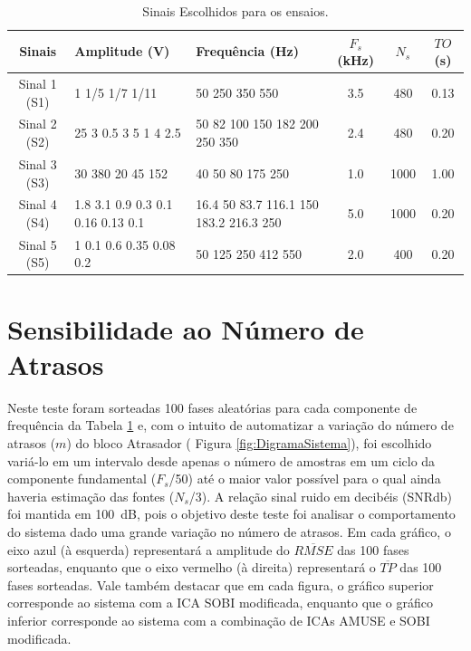 \documentclass[a4paper,12pt]{monografia}
\theoremstyle{plain}
\theoremstyle{definition}
\theoremstyle{remark}
\begin{document}
\begin{table}[!htb]
    \begin{center}

        \caption{Sinais Escolhidos para os ensaios.}
        \begin{tabular}{c| m{4cm} | m{4cm} |c|c|c}
        \hline
        Sinais & Amplitude (V) & Frequência (Hz) & $F_s$ (kHz) & $N_s$ & $TO$ (s)\\\hline
        Sinal 1 (S1)& 1 1/5 1/7 1/11  & 50 250 350 550  & 3.5 & 480 & 0.13\\ \hline
        Sinal 2 (S2)& 25  3  0.5  3  5  1  4  2.5 & 50  82  100  150  182  200  250  350 & 2.4 & 480 & 0.20 \\ \hline
        Sinal 3 (S3)& 30  380  20  45  152 & 40  50 80  175  250  & 1.0 & 1000 & 1.00\\ \hline
        Sinal 4 (S4)& 1.8  3.1  0.9  0.3  0.1  0.16  0.13  0.1 & 16.4  50  83.7  116.1  150  183.2  216.3  250 & 5.0 & 1000 & 0.20\\ \hline
        Sinal 5 (S5)& 1  0.1  0.6  0.35  0.08  0.2  & 50  125  250  412  550  & 2.0 & 400 & 0.20\\ \hline
        \end{tabular}
        \label{tab:Sinais}
    \end{center}
\end{table}

\section{Sensibilidade ao Número de Atrasos}
Neste teste foram sorteadas 100 fases aleatórias para cada componente de frequência da Tabela \ref{tab:Sinais} e, com o intuito de automatizar a variação do número de atrasos ($m$) do bloco Atrasador ( Figura \ref{fig:DigramaSistema}), foi escolhido variá-lo em um intervalo desde apenas o número de amostras em um ciclo da componente fundamental ($F_s$/50) até o maior valor possível para o qual ainda haveria estimação das fontes ($N_s$/3). A relação sinal ruido em decibéis (SNRdb) foi mantida em 100~dB, pois o objetivo deste teste foi analisar o comportamento do sistema dado uma grande variação no número de atrasos.
Em cada gráfico, o eixo azul (à esquerda) representará a amplitude do $\overline{RMSE}$ das 100 fases sorteadas, enquanto que o eixo vermelho (à direita) representará o $\overline{TP}$ das 100 fases sorteadas. Vale também destacar que em cada figura, o gráfico superior corresponde ao sistema com a ICA SOBI modificada, enquanto que o gráfico inferior corresponde ao sistema com a combinação de ICAs AMUSE e SOBI modificada. 
\end{document}
